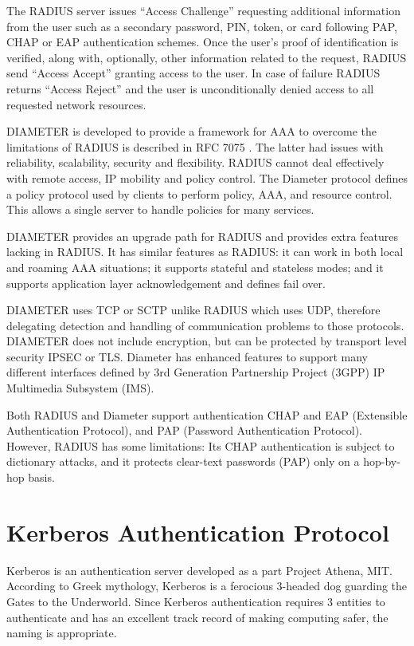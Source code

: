 \begin{multicols}{2}
The RADIUS server issues ``Access Challenge'' requesting additional information from the user such as a secondary password, PIN, token, or card following PAP, CHAP or EAP \cite{key9} authentication schemes. Once the user's proof of identification is verified, along with, optionally, other information related to the request, RADIUS send ``Access Accept'' granting access to the user. In case of failure RADIUS returns ``Access Reject'' and the user is unconditionally denied access to all requested network resources.

DIAMETER is developed to provide a framework for AAA to overcome the limitations of RADIUS is described in RFC 7075 \cite{key24}. The latter had issues with reliability, scalability, security and flexibility. RADIUS cannot deal effectively with remote access, IP mobility and policy control. The Diameter protocol defines a policy protocol used by clients to perform policy, AAA, and resource control. This allows a single server to handle policies for many services.

DIAMETER provides an upgrade path for RADIUS and provides extra features lacking in RADIUS. It has similar features as RADIUS: it can work in both local and roaming AAA situations; it supports stateful and stateless modes; and it supports application layer acknowledgement and defines fail over.

DIAMETER uses TCP or SCTP unlike RADIUS which uses UDP, therefore delegating detection and handling of communication problems to those protocols. DIAMETER does not include encryption, but can be protected by transport level security IPSEC or TLS. Diameter has enhanced features to support many different interfaces defined by 3rd Generation Partnership Project (3GPP) IP Multimedia Subsystem (IMS).

Both RADIUS and Diameter support authentication CHAP and EAP (Extensible Authentication Protocol), and PAP (Password Authentication Protocol). However, RADIUS has some limitations: Its CHAP authentication is subject to dictionary attacks, and it protects clear-text passwords (PAP) only on a hop-by-hop basis. 

\section*{Kerberos Authentication Protocol}

Kerberos is an authentication server developed as a part Project Athena, MIT. According to Greek mythology, Kerberos is a ferocious 3-headed dog guarding the Gates to the Underworld. Since Kerberos authentication requires 3 entities to authenticate and has an excellent track record of making computing safer, the naming is appropriate. 


\end{multicols}
